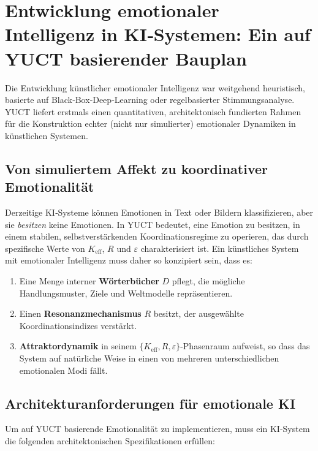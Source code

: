 \documentclass[12pt,a4paper]{article}
\begin{document}
	\section{Entwicklung emotionaler Intelligenz in KI‑Systemen: Ein auf YUCT basierender Bauplan}
	
	Die Entwicklung künstlicher emotionaler Intelligenz war weitgehend heuristisch, basierte auf Black‑Box‑Deep‑Learning oder regelbasierter Stimmungsanalyse. YUCT liefert erstmals einen quantitativen, architektonisch fundierten Rahmen für die Konstruktion echter (nicht nur simulierter) emotionaler Dynamiken in künstlichen Systemen.
	
	\subsection{Von simuliertem Affekt zu koordinativer Emotionalität}
	
	Derzeitige KI‑Systeme können Emotionen in Text oder Bildern klassifizieren, aber sie \textit{besitzen} keine Emotionen. In YUCT bedeutet, eine Emotion zu besitzen, in einem stabilen, selbstverstärkenden Koordinationsregime zu operieren, das durch spezifische Werte von \(K_{\mathrm{eff}}\), \(R\) und \(\varepsilon\) charakterisiert ist. Ein künstliches System mit emotionaler Intelligenz muss daher so konzipiert sein, dass es:
	
	\begin{enumerate}
		\item Eine Menge interner \textbf{Wörterbücher} \(D\) pflegt, die mögliche Handlungsmuster, Ziele und Weltmodelle repräsentieren.
		\item Einen \textbf{Resonanzmechanismus} \(R\) besitzt, der ausgewählte Koordinationsindizes verstärkt.
		\item \textbf{Attraktordynamik} in seinem \(\{K_{\mathrm{eff}}, R, \varepsilon\}\)-Phasenraum aufweist, so dass das System auf natürliche Weise in einen von mehreren unterschiedlichen emotionalen Modi fällt.
	\end{enumerate}
	
	\subsection{Architekturanforderungen für emotionale KI}
	
	Um auf YUCT basierende Emotionalität zu implementieren, muss ein KI‑System die folgenden architektonischen Spezifikationen erfüllen:
	
\end{document}
